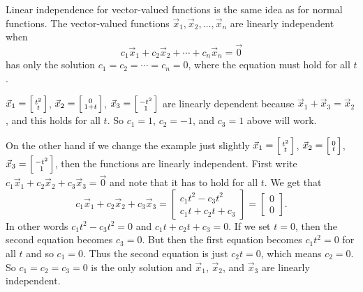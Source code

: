 Linear independence for vector-valued functions is the same idea as
for normal functions.
The vector-valued functions
$\vec{x}_1,\vec{x}_2,\ldots,\vec{x}_n$ are
linearly independent
when
\begin{equation*}
c_1 \vec{x}_1 + c_2 \vec{x}_2 + \cdots + c_n \vec{x}_n  = \vec{0}
\end{equation*}
has only the solution $c_1 = c_2 = \cdots = c_n = 0$, where the equation
must hold for all $t$.

\begin{example}
$\vec{x}_1 = \Bigl[ \begin{smallmatrix} t^2 \\ t \end{smallmatrix} \Bigr]$,
$\vec{x}_2 = \Bigl[ \begin{smallmatrix} 0 \\ 1+t \end{smallmatrix} \Bigr]$,
$\vec{x}_3 = \Bigl[ \begin{smallmatrix} -t^2 \\ 1 \end{smallmatrix} \Bigr]$
are linearly dependent because
$\vec{x}_1 + \vec{x}_3 = \vec{x}_2$, and this holds for all $t$.  So $c_1 =
1$, $c_2 = -1$, and $c_3 = 1$ above will work.

On the other hand if we change the example just slightly
$\vec{x}_1 = \Bigl[ \begin{smallmatrix} t^2 \\ t \end{smallmatrix} \Bigr]$,
$\vec{x}_2 = \Bigl[ \begin{smallmatrix} 0 \\ t \end{smallmatrix} \Bigr]$,
$\vec{x}_3 = \Bigl[ \begin{smallmatrix} -t^2 \\ 1 \end{smallmatrix}
\Bigr]$,
then the functions are linearly independent.
First write
$c_1 \vec{x}_1 + c_2 \vec{x}_2 + c_3 \vec{x}_3  = \vec{0}$ and note that it
has to hold for all $t$.  We get that
\begin{equation*}
c_1 \vec{x}_1 + c_2 \vec{x}_2 + c_3 \vec{x}_3
=
\begin{bmatrix}
c_1 t^2 - c_3 t^2
\\
c_1 t + c_2 t + c_3 
\end{bmatrix}
=
\begin{bmatrix}
0
\\
0
\end{bmatrix} .
\end{equation*}
In other words
$c_1 t^2 - c_3 t^2 = 0$ and
$c_1 t + c_2 t + c_3 = 0$.
If we set $t = 0$, then the second equation becomes $c_3 = 0$.  But then
the first equation becomes
$c_1 t^2 = 0$ for all $t$ and so $c_1 = 0$.  Thus the second equation
is just $c_2 t = 0$, which means $c_2 = 0$.  So $c_1 = c_2 = c_3 = 0$
is the only solution and $\vec{x}_1$,
$\vec{x}_2$, and $\vec{x}_3$ are linearly independent.
\end{example}

